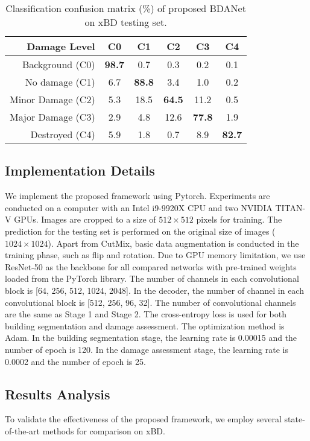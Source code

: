 \documentclass[journal]{IEEEtran}
\begin{document}
\begin{table}[t]
	\centering
	\caption{Classification confusion matrix (\%)  of proposed BDANet on xBD testing set.}
	\begin{tabular}{rccccc}
	\hline
	\hline
	  Damage Level  & C0 & C1 & C2  & C3 & C4 \\
    \hline
    Background (C0) &\textbf{98.7} 	&0.7 &0.3 &	0.2 &	0.1  \\
    No damage (C1) & 6.7 	&\textbf{88.8} &3.4 & 1.0 &	0.2 \\
    Minor Damage (C2) & 5.3 &18.5 &\textbf{64.5} &11.2 &0.5\\
    Major Damage (C3)&  2.9 &	4.8 &	12.6 &	\textbf{77.8} &	1.9\\
    Destroyed (C4) &5.9 &	1.8 &	0.7 &	8.9 &	\textbf{82.7} \\
\hline
\hline
	\end{tabular}
\label{tabConfusion}
\end{table}

\subsection{Implementation Details}
We implement the proposed framework using Pytorch. Experiments are conducted on a computer with an Intel i9-9920X CPU and two NVIDIA TITAN-V GPUs. Images are cropped to a size of $512\times 512$ pixels for training. The prediction for the testing set is performed on the original size of images ($1024\times 1024$). Apart from CutMix, basic data augmentation is conducted in the training phase, such as flip and rotation. Due to GPU memory limitation, we use ResNet-50 as the backbone for all compared networks with pre-trained weights loaded from the PyTorch library. The number of channels in each convolutional block is [64, 256, 512, 1024, 2048]. In the decoder, the number of channel in each convolutional block is [512, 256, 96, 32]. The number of convolutional channels are the same as  Stage 1 and Stage 2. The cross-entropy loss is used for both building segmentation and damage assessment. The optimization method is Adam. In the building segmentation stage, the learning rate is 0.00015 and the number of epoch is 120. In the damage assessment stage, the learning rate is 0.0002 and the number of epoch is 25.



\subsection{Results Analysis}
To validate the effectiveness of the proposed framework, we employ several state-of-the-art methods for comparison on xBD. 
\end{document}
